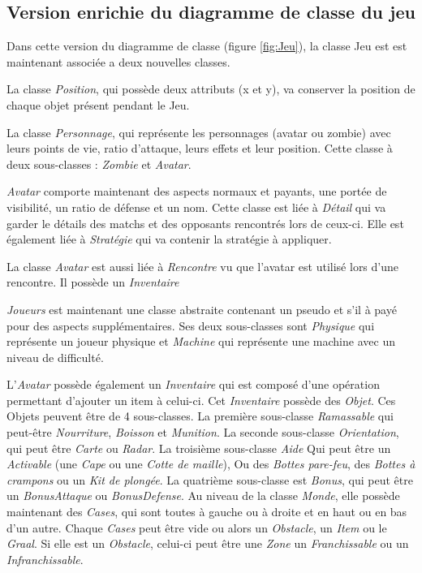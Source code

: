 
\subsection{Version enrichie du diagramme de classe du jeu}
\label{sec:question-2}

Dans cette version du diagramme de classe (figure \ref{fig:Jeu}), la classe Jeu est est maintenant associée a deux nouvelles classes.

La classe \emph{Position}, qui possède deux attributs (x et y), va conserver la position de chaque objet présent pendant le Jeu.

La classe \emph{Personnage}, qui représente les personnages (avatar ou zombie) avec leurs points de vie, ratio d'attaque, leurs effets et leur position. Cette classe à deux sous-classes :
\emph{Zombie} et \emph{Avatar}.

\emph{Avatar} comporte maintenant des aspects normaux et payants, une portée de visibilité, un ratio de défense et un nom. Cette classe est liée à \emph{Détail} qui va garder le détails des matchs et des
opposants rencontrés lors de ceux-ci. Elle est également liée à \emph{Stratégie} qui va contenir la stratégie à appliquer.

La classe \emph{Avatar} est aussi liée à \emph{Rencontre} vu que l'avatar est utilisé lors d'une rencontre. Il possède un \emph{Inventaire}

\emph{Joueurs} est maintenant une classe abstraite contenant un pseudo et s'il à payé pour des aspects supplémentaires. Ses deux sous-classes sont \emph{Physique} qui représente un joueur physique et 
\emph{Machine} qui représente une machine avec un niveau de difficulté.

L'\emph{Avatar} possède également un \emph{Inventaire} qui est composé d'une opération permettant d'ajouter un item à celui-ci. Cet \emph{Inventaire} possède des \emph{Objet}. Ces Objets peuvent être de 4
sous-classes. La première sous-classe \emph{Ramassable} qui peut-être \emph{Nourriture}, \emph{Boisson} et \emph{Munition}. La seconde sous-classe \emph{Orientation}, qui peut être \emph{Carte} ou \emph{Radar}.
La troisième sous-classe \emph{Aide} Qui peut être un \emph{Activable} (une \emph{Cape} ou une \emph{Cotte de maille}), Ou des \emph{Bottes pare-feu}, des \emph{Bottes à crampons} ou un \emph{Kit de plongée}. La quatrième
sous-classe est \emph{Bonus}, qui peut être un \emph{BonusAttaque} ou \emph{BonusDefense}.
Au niveau de la classe \emph{Monde}, elle possède maintenant des \emph{Cases}, qui sont toutes à gauche ou à droite et en haut ou en bas d'un autre. Chaque \emph{Cases} peut être vide ou
alors un \emph{Obstacle}, un \emph{Item} ou le \emph{Graal}. Si elle est un \emph{Obstacle}, celui-ci peut être une \emph{Zone} un \emph{Franchissable} ou un \emph{Infranchissable}.


